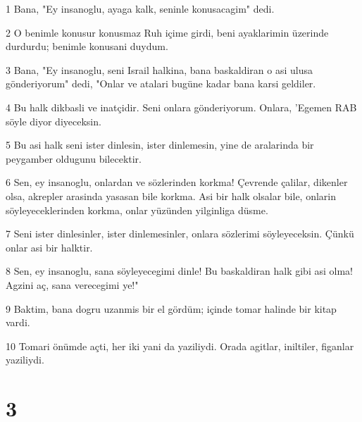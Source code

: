 \par 1 Bana, "Ey insanoglu, ayaga kalk, seninle konusacagim" dedi.
\par 2 O benimle konusur konusmaz Ruh içime girdi, beni ayaklarimin üzerinde durdurdu; benimle konusani duydum.
\par 3 Bana, "Ey insanoglu, seni Israil halkina, bana baskaldiran o asi ulusa gönderiyorum" dedi, "Onlar ve atalari bugüne kadar bana karsi geldiler.
\par 4 Bu halk dikbasli ve inatçidir. Seni onlara gönderiyorum. Onlara, 'Egemen RAB söyle diyor diyeceksin.
\par 5 Bu asi halk seni ister dinlesin, ister dinlemesin, yine de aralarinda bir peygamber oldugunu bilecektir.
\par 6 Sen, ey insanoglu, onlardan ve sözlerinden korkma! Çevrende çalilar, dikenler olsa, akrepler arasinda yasasan bile korkma. Asi bir halk olsalar bile, onlarin söyleyeceklerinden korkma, onlar yüzünden yilginliga düsme.
\par 7 Seni ister dinlesinler, ister dinlemesinler, onlara sözlerimi söyleyeceksin. Çünkü onlar asi bir halktir.
\par 8 Sen, ey insanoglu, sana söyleyecegimi dinle! Bu baskaldiran halk gibi asi olma! Agzini aç, sana verecegimi ye!"
\par 9 Baktim, bana dogru uzanmis bir el gördüm; içinde tomar halinde bir kitap vardi.
\par 10 Tomari önümde açti, her iki yani da yaziliydi. Orada agitlar, iniltiler, figanlar yaziliydi.

\chapter{3}

